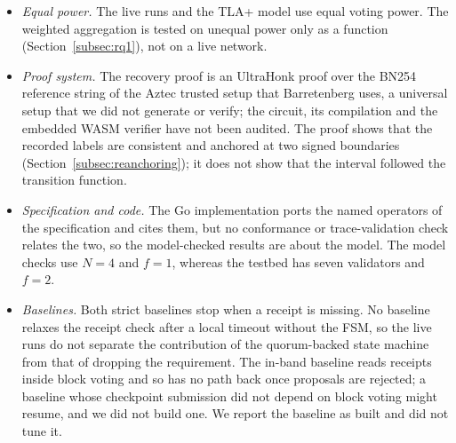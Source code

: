 \begin{itemize}
  \item \emph{Equal power.} The live runs and the TLA+ model use equal voting power. The weighted aggregation is tested on unequal power
  only as a function (Section~\ref{subsec:rq1}), not on a live network.
  \item \emph{Proof system.} The recovery proof is an UltraHonk proof over the BN254 reference string of the Aztec trusted setup that Barretenberg uses, a universal setup that we did not generate or verify; the circuit, its compilation and the embedded WASM verifier have not been audited. The proof shows that the recorded labels are consistent and anchored at two signed boundaries (Section~\ref{subsec:reanchoring}); it does not show that the interval followed the transition function.
  \item \emph{Specification and code.} The Go implementation ports the named operators of the specification and cites them, but no conformance or trace-validation check relates the two, so the model-checked results are about the model. The model checks use $N{=}4$ and $f{=}1$, whereas the testbed has seven validators and $f{=}2$.
  \item \emph{Baselines.} Both strict baselines stop when a receipt is missing. No baseline relaxes the receipt check after a local timeout without the FSM, so the live runs do not separate the contribution of the quorum-backed state machine from that of dropping the requirement. The in-band baseline reads receipts inside block voting and so has no path back once proposals are rejected; a baseline whose checkpoint submission did not depend on block voting might resume, and we did not build one. We report the baseline as built and did not tune it.

\end{itemize}
